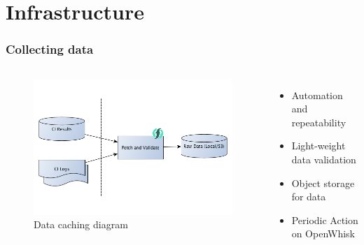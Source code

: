 \documentclass[aspectratio=169,11pt,hyperref={colorlinks=true}]{beamer}
\begin{document}
\section{Infrastructure}
\begin{frame}
    \frametitle{Collecting data}
    \begin{columns}
        \begin{figure}
        \begin{center}
          \includegraphics[width=1\textwidth]{diagrams/cache-data.png}
             \caption{Data caching diagram}
        \end{center}
        \end{figure}
        \begin{itemize}
            \item{Automation and repeatability}
            \item{Light-weight data validation}
            \item{Object storage for data}
            \item{Periodic Action on OpenWhisk}
        \end{itemize}
    \end{columns}
\end{frame}
\end{document}
